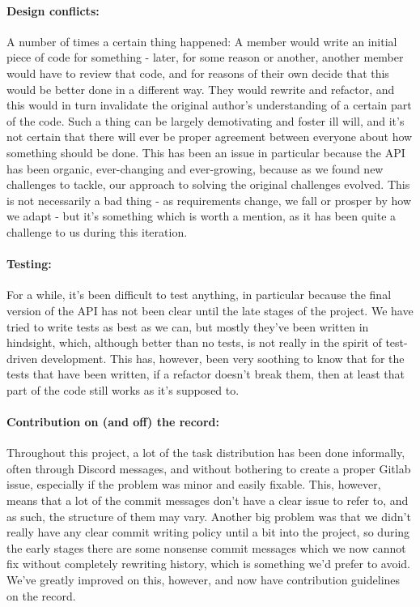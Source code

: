 \documentclass{article}
\begin{document}
\paragraph{Design conflicts:} A number of times a certain thing happened: A member would write an initial piece of code for something - later, for some reason or another, another member would have to review that code, and for reasons of their own decide that this would be better done in a different way. They would rewrite and refactor, and this would in turn invalidate the original author's understanding of a certain part of the code. Such a thing can be largely demotivating and foster ill will, and it's not certain that there will ever be proper agreement between everyone about how something should be done. This has been an issue in particular because the API has been organic, ever-changing and ever-growing, because as we found new challenges to tackle, our approach to solving the original challenges evolved. This is not necessarily a bad thing - as requirements change, we fall or prosper by how we adapt - but it's something which is worth a mention, as it has been quite a challenge to us during this iteration.

\paragraph{Testing:} For a while, it's been difficult to test anything, in particular because the final version of the API has not been clear until the late stages of the project. We have tried to write tests as best as we can, but mostly they've been written in hindsight, which, although better than no tests, is not really in the spirit of test-driven development. This has, however, been very soothing to know that for the tests that have been written, if a refactor doesn't break them, then at least that part of the code still works as it's supposed to.

\paragraph{Contribution on (and off) the record:} Throughout this project, a lot of the task distribution has been done informally, often through Discord messages, and without bothering to create a proper Gitlab issue, especially if the problem was minor and easily fixable. This, however, means that a lot of the commit messages don't have a clear issue to refer to, and as such, the structure of them may vary. Another big problem was that we didn't really have any clear commit writing policy until a bit into the project, so during the early stages there are some nonsense commit messages which we now cannot fix without completely rewriting history, which is something we'd prefer to avoid. We've greatly improved on this, however, and now have contribution guidelines on the record.
\end{document}
